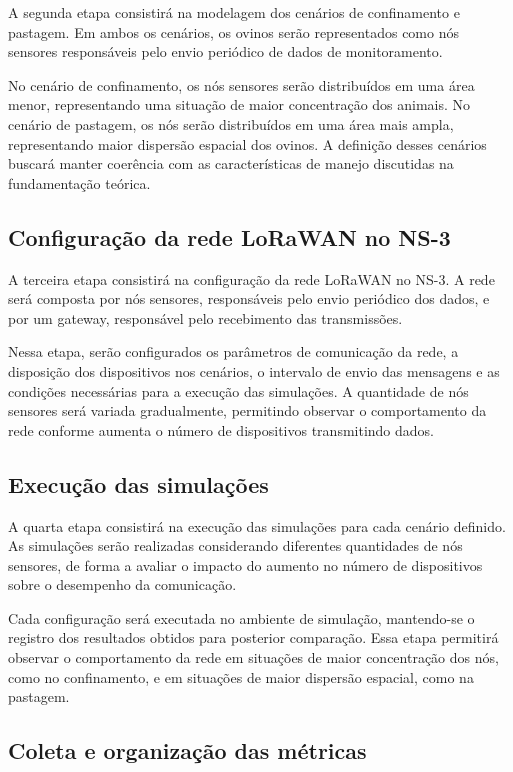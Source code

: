 A segunda etapa consistirá na modelagem dos cenários de confinamento e pastagem. Em ambos os cenários, os ovinos serão representados como nós sensores responsáveis pelo envio periódico de dados de monitoramento.

No cenário de confinamento, os nós sensores serão distribuídos em uma área menor, representando uma situação de maior concentração dos animais. No cenário de pastagem, os nós serão distribuídos em uma área mais ampla, representando maior dispersão espacial dos ovinos. A definição desses cenários buscará manter coerência com as características de manejo discutidas na fundamentação teórica.

\subsection{Configuração da rede LoRaWAN no NS-3}
\label{subsec:configuracao-rede}

A terceira etapa consistirá na configuração da rede LoRaWAN no NS-3. A rede será composta por nós sensores, responsáveis pelo envio periódico dos dados, e por um gateway, responsável pelo recebimento das transmissões.

Nessa etapa, serão configurados os parâmetros de comunicação da rede, a disposição dos dispositivos nos cenários, o intervalo de envio das mensagens e as condições necessárias para a execução das simulações. A quantidade de nós sensores será variada gradualmente, permitindo observar o comportamento da rede conforme aumenta o número de dispositivos transmitindo dados.

\subsection{Execução das simulações}
\label{subsec:execucao-simulacoes}

A quarta etapa consistirá na execução das simulações para cada cenário definido. As simulações serão realizadas considerando diferentes quantidades de nós sensores, de forma a avaliar o impacto do aumento no número de dispositivos sobre o desempenho da comunicação.

Cada configuração será executada no ambiente de simulação, mantendo-se o registro dos resultados obtidos para posterior comparação. Essa etapa permitirá observar o comportamento da rede em situações de maior concentração dos nós, como no confinamento, e em situações de maior dispersão espacial, como na pastagem.

\subsection{Coleta e organização das métricas}
\label{subsec:coleta-metricas}


